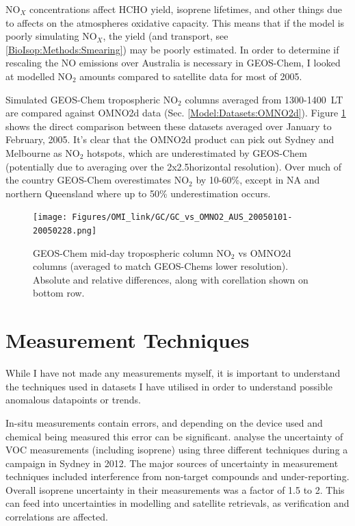     NO$_X$ concentrations affect HCHO yield, isoprene lifetimes, and other things due to affects on the atmospheres oxidative capacity.
    This means that if the model is poorly simulating NO$_X$, the yield (and transport, see \ref{BioIsop:Methods:Smearing}) may be poorly estimated.
    In order to determine if rescaling the NO emissions over Australia is necessary in GEOS-Chem, I looked at modelled NO$_2$ amounts compared to satellite data for most of 2005.
    
    
    Simulated GEOS-Chem tropospheric NO$_2$ columns averaged from 1300-1400~LT are compared against OMNO2d data (Sec. \ref{Model:Datasets:OMNO2d}). 
    Figure \ref{Model:Filter:NOx:fig_GC_vs_OMNO2d_AUS_Sum_2005} shows the direct comparison between these datasets averaged over January to February, 2005.
    It's clear that the OMNO2d product can pick out Sydney and Melbourne as NO$_2$ hotspots, which are underestimated by GEOS-Chem (potentially due to averaging over the 2x2.5\degr horizontal resolution).
    Over much of the country GEOS-Chem overestimates NO$_2$ by 10-60\%, except in NA and northern Queensland where up to 50\% underestimation occurs.
    
    \begin{figure}
      \texttt{[image: Figures/OMI\_link/GC/GC\_vs\_OMNO2\_AUS\_20050101-20050228.png]}
      \caption{%
        GEOS-Chem mid-day tropospheric column NO$_2$ vs OMNO2d columns (averaged to match GEOS-Chems lower resolution).
        Absolute and relative differences, along with corellation shown on bottom row.
        }
      \label{Model:Filter:NOx:fig_GC_vs_OMNO2d_AUS_Sum_2005}
    \end{figure}


\section{Measurement Techniques}
  \label{Model:Meas}
  While I have not made any measurements myself, it is important to understand the techniques used in datasets I have utilised in order to understand possible anomalous datapoints or trends.
  
  In-situ measurements contain errors, and depending on the device used and chemical being measured this error can be significant.
  \textcite{Dunne2017} analyse the uncertainty of VOC measurements (including isoprene) using three different techniques during a campaign in Sydney in 2012.
  The major sources of uncertainty in measurement techniques included interference from non-target compounds and under-reporting.
  Overall isoprene uncertainty in their measurements was a factor of 1.5 to 2.
  This can feed into uncertainties in modelling and satellite retrievals, as verification and correlations are affected.
  
